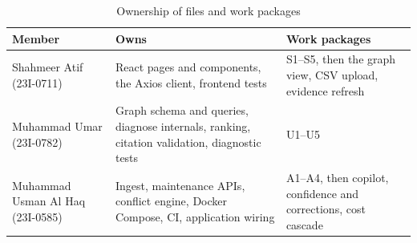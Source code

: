 \begin{table}[H]
\centering
\caption{Ownership of files and work packages}
\label{tab:ownership}
\small
\begin{tabularx}{\textwidth}{@{}>{\raggedright\arraybackslash}p{} L >{\raggedright\arraybackslash}p{0.26\textwidth}@{}}
\toprule
Member & Owns & Work packages \\
\midrule
Shahmeer Atif (23I-0711) & React pages and components, the Axios client, frontend tests & S1--S5, then the graph view, CSV upload, evidence refresh \\
Muhammad Umar (23I-0782) & Graph schema and queries, diagnose internals, ranking, citation validation, diagnostic tests & U1--U5 \\
Muhammad Usman Al Haq (23I-0585) & Ingest, maintenance APIs, conflict engine, Docker Compose, CI, application wiring & A1--A4, then copilot, confidence and corrections, cost cascade \\
\bottomrule
\end{tabularx}
\end{table}
